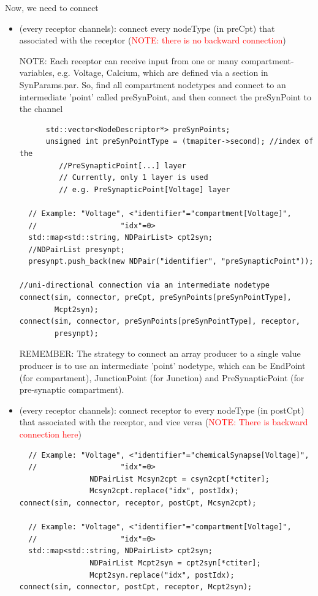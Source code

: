 Now, we need to connect 
\begin{itemize}
  \item  (every receptor channels): connect every nodeType (in preCpt) that
  associated with the receptor (\textcolor{red}{NOTE: there is no backward
  connection})

NOTE: Each receptor can receive input from one or many compartment-variables,
e.g. Voltage, Calcium, which are defined via a section in SynParams.par. So,
find all compartment nodetypes and connect to 
an intermediate 'point' called preSynPoint, and then connect the preSynPoint
to the channel
\begin{verbatim}
      std::vector<NodeDescriptor*> preSynPoints;
      unsigned int preSynPointType = (tmapiter->second); //index of the
         //PreSynapticPoint[...] layer
         // Currently, only 1 layer is used
         // e.g. PreSynapticPoint[Voltage] layer
      
  // Example: "Voltage", <"identifier"="compartment[Voltage]",
  //                   "idx"=0>
  std::map<std::string, NDPairList> cpt2syn;
  //NDPairList presynpt;
  presynpt.push_back(new NDPair("identifier", "preSynapticPoint"));

//uni-directional connection via an intermediate nodetype
connect(sim, connector, preCpt, preSynPoints[preSynPointType],
        Mcpt2syn);
connect(sim, connector, preSynPoints[preSynPointType], receptor,
        presynpt);
\end{verbatim}
   
REMEMBER: The strategy to connect an array producer to a single value producer
is to use an intermediate 'point' nodetype, which can be EndPoint (for
compartment), JunctionPoint (for Junction) and PreSynapticPoint (for
pre-synaptic compartment).

  \item  (every receptor channels): connect receptor to every nodeType (in
  postCpt) that associated with the receptor, and vice versa
  (\textcolor{red}{NOTE: There is backward connection here})

\begin{verbatim}
  // Example: "Voltage", <"identifier"="chemicalSynapse[Voltage]",
  //                   "idx"=0>
                NDPairList Mcsyn2cpt = csyn2cpt[*ctiter];
                Mcsyn2cpt.replace("idx", postIdx);
connect(sim, connector, receptor, postCpt, Mcsyn2cpt);

  // Example: "Voltage", <"identifier"="compartment[Voltage]",
  //                   "idx"=0>
  std::map<std::string, NDPairList> cpt2syn;
                NDPairList Mcpt2syn = cpt2syn[*ctiter];
                Mcpt2syn.replace("idx", postIdx);
connect(sim, connector, postCpt, receptor, Mcpt2syn);


\end{verbatim}
\end{itemize}
